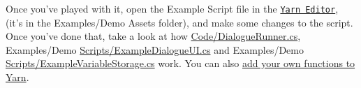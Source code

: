 Once you've played with it, open the Example Script file in the \href{http://github.com/infiniteammoinc/Yarn}{\tt Yarn Editor}, (it's in the {\ttfamily Examples/\-Demo Assets} folder), and make some changes to the script. Once you've done that, take a look at how {\ttfamily \hyperlink{a00283}{Code/\-Dialogue\-Runner.\-cs}}, {\ttfamily Examples/\-Demo \hyperlink{a00287}{Scripts/\-Example\-Dialogue\-U\-I.\-cs}} and {\ttfamily Examples/\-Demo \hyperlink{a00288}{Scripts/\-Example\-Variable\-Storage.\-cs}} work. You can also \hyperlink{a00210}{add your own functions to Yarn}. 